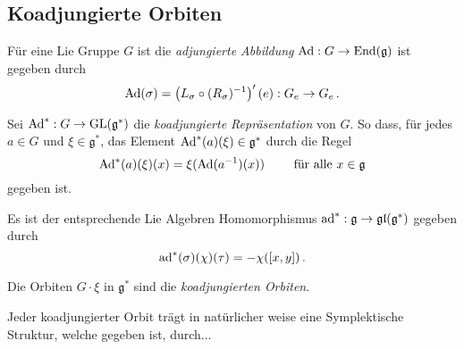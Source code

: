 \subsection{Koadjungierte Orbiten}
\begin{comment}
\begin{itemize}
\item 
siehe \cite{bryant} auf Seite 86ff
\begin{itemize}
\item 
vor allem \cite[Proposition 3]{bryant} auf Seite 86.
\end{itemize}
\item 
siehe \cite{warnerLie} auf Seite 112ff
\end{itemize}
\end{comment}
\begin{defn}
Für eine Lie Gruppe $G$ ist die \emph{adjungierte Abbildung} 
$\operatorname{Ad}: G \to \operatorname{End}(\mathfrak g)$ 
ist gegeben durch
\[
\operatorname{Ad}(\sigma)=\left(L_\sigma\circ (R_\sigma)^{-1}\right)'(e):G_e\to G_e \,.
\]
\end{defn}
\begin{comment}
\begin{defn} \comm{(siehe Seite 16 \protect\cite{bryant})}
 ...die \emph{adjungierte Repräsentation von $G$}...
\end{defn}
\end{comment}
\begin{defn}
Sei $\operatorname{Ad}^*:G\to\operatorname{GL}(\mathfrak g^*)$ die \emph{koadjungierte Repräsentation}
von $G$.
So dass, für jedes $a\in G$ und $\xi \in \mathfrak g^*$, das Element
$\operatorname{Ad}^*(a)(\xi)\in \mathfrak g^*$ durch die Regel
\[
\operatorname{Ad}^*(a)(\xi)(x)=\xi(\operatorname{Ad}(a^{-1})(x)) \qquad \text{ für alle } x\in \mathfrak g
\]
gegeben ist.
\end{defn}
\begin{bem} 
Es ist der entsprechende Lie Algebren Homomorphismus $\operatorname{ad}^*:\mathfrak g \to
\mathfrak{gl(g^*)}$ gegeben durch
\[
\operatorname{ad}^*(\sigma)(\chi)(\tau)=-\chi([x,y]) \,.
\]
\end{bem}
\begin{defn} 
Die Orbiten $G\cdot \xi$ in $\mathfrak g^*$ sind die
\emph{koadjungierten Orbiten}.
\end{defn}
Jeder koadjungierter Orbit trägt in natürlicher weise eine Symplektische
Struktur, welche gegeben ist, durch...
\begin{comment}
\begin{ex} \comm{(von \protect\cite[p. 96]{bryant})}
\textbf{10.} For any Lie group $G$ and any $\xi\in\mathfrak g^∗$, show that the
symplectic structures $\Omega_\xi$ and $\Omega_{\sigma\cdot\xi}$ on
$G\cdot\xi$ are the same for any $\sigma\in G$.
\end{ex}
\end{comment}

